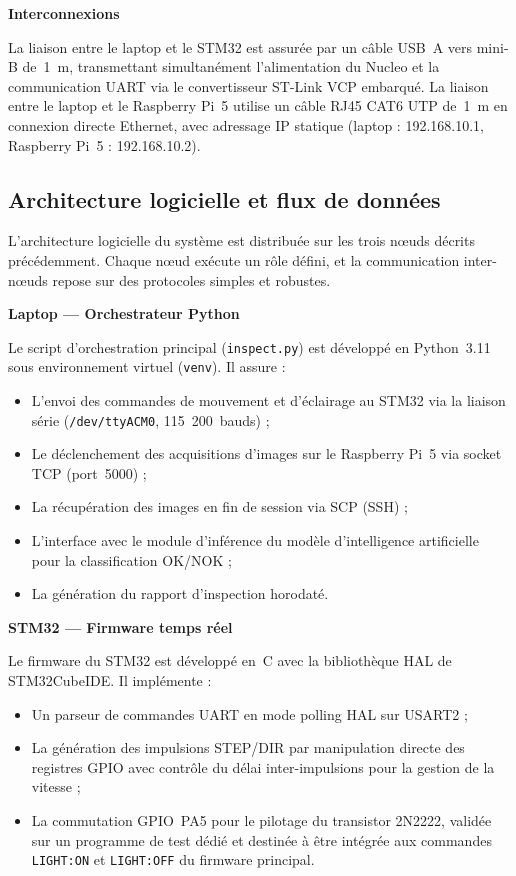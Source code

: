 \medskip
\noindent\textbf{Interconnexions}

La liaison entre le laptop et le STM32 est assurée par un câble USB~A vers mini-B de~1~m,
transmettant simultanément l'alimentation du Nucleo et la communication UART via le
convertisseur ST-Link VCP embarqué. La liaison entre le laptop et le Raspberry Pi~5 utilise
un câble RJ45 CAT6 UTP de~1~m en connexion directe Ethernet, avec adressage IP statique
(laptop : 192.168.10.1, Raspberry Pi~5 : 192.168.10.2).

\subsection{Architecture logicielle et flux de données}
\label{sec:archi_log}

L'architecture logicielle du système est distribuée sur les trois nœuds décrits précédemment.
Chaque nœud exécute un rôle défini, et la communication inter-nœuds repose sur des protocoles
simples et robustes.

\medskip
\noindent\textbf{Laptop — Orchestrateur Python}

Le script d'orchestration principal (\texttt{inspect.py}) est développé en Python~3.11 sous
environnement virtuel (\texttt{venv}). Il assure :
\begin{itemize}
\item L'envoi des commandes de mouvement et d'éclairage au STM32 via la liaison série
      (\texttt{/dev/ttyACM0}, 115~200~bauds) ;
\item Le déclenchement des acquisitions d'images sur le Raspberry Pi~5 via socket TCP
      (port~5000) ;
\item La récupération des images en fin de session via SCP (SSH) ;
\item L'interface avec le module d'inférence du modèle d'intelligence artificielle pour
      la classification OK/NOK ;
\item La génération du rapport d'inspection horodaté.
\end{itemize}

\medskip
\noindent\textbf{STM32 — Firmware temps réel}

Le firmware du STM32 est développé en~C avec la bibliothèque HAL de STM32CubeIDE. Il
implémente :
\begin{itemize}
\item Un parseur de commandes UART en mode polling HAL sur USART2 ;
\item La génération des impulsions STEP/DIR par manipulation directe des registres GPIO
      avec contrôle du délai inter-impulsions pour la gestion de la vitesse ;
\item La commutation GPIO~PA5 pour le pilotage du transistor 2N2222, validée sur un
      programme de test dédié et destinée à être intégrée aux commandes \texttt{LIGHT:ON}
      et \texttt{LIGHT:OFF} du firmware principal.
\end{itemize}


